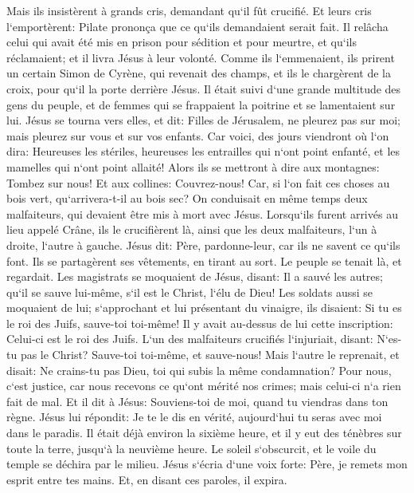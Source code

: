 \verse Mais ils insistèrent à grands cris, demandant qu`il fût crucifié. Et leurs cris l`emportèrent: 
\verse Pilate prononça que ce qu`ils demandaient serait fait. 
\verse Il relâcha celui qui avait été mis en prison pour sédition et pour meurtre, et qu`ils réclamaient; et il livra Jésus à leur volonté. 
\verse Comme ils l`emmenaient, ils prirent un certain Simon de Cyrène, qui revenait des champs, et ils le chargèrent de la croix, pour qu`il la porte derrière Jésus. 
\verse Il était suivi d`une grande multitude des gens du peuple, et de femmes qui se frappaient la poitrine et se lamentaient sur lui. 
\verse Jésus se tourna vers elles, et dit: Filles de Jérusalem, ne pleurez pas sur moi; mais pleurez sur vous et sur vos enfants. 
\verse Car voici, des jours viendront où l`on dira: Heureuses les stériles, heureuses les entrailles qui n`ont point enfanté, et les mamelles qui n`ont point allaité! 
\verse Alors ils se mettront à dire aux montagnes: Tombez sur nous! Et aux collines: Couvrez-nous! 
\verse Car, si l`on fait ces choses au bois vert, qu`arrivera-t-il au bois sec? 
\verse On conduisait en même temps deux malfaiteurs, qui devaient être mis à mort avec Jésus. 
\verse Lorsqu`ils furent arrivés au lieu appelé Crâne, ils le crucifièrent là, ainsi que les deux malfaiteurs, l`un à droite, l`autre à gauche. 
\verse Jésus dit: Père, pardonne-leur, car ils ne savent ce qu`ils font. Ils se partagèrent ses vêtements, en tirant au sort. 
\verse Le peuple se tenait là, et regardait. Les magistrats se moquaient de Jésus, disant: Il a sauvé les autres; qu`il se sauve lui-même, s`il est le Christ, l`élu de Dieu! 
\verse Les soldats aussi se moquaient de lui; s`approchant et lui présentant du vinaigre, 
\verse ils disaient: Si tu es le roi des Juifs, sauve-toi toi-même! 
\verse Il y avait au-dessus de lui cette inscription: Celui-ci est le roi des Juifs. 
\verse L`un des malfaiteurs crucifiés l`injuriait, disant: N`es-tu pas le Christ? Sauve-toi toi-même, et sauve-nous! 
\verse Mais l`autre le reprenait, et disait: Ne crains-tu pas Dieu, toi qui subis la même condamnation? 
\verse Pour nous, c`est justice, car nous recevons ce qu`ont mérité nos crimes; mais celui-ci n`a rien fait de mal. 
\verse Et il dit à Jésus: Souviens-toi de moi, quand tu viendras dans ton règne. 
\verse Jésus lui répondit: Je te le dis en vérité, aujourd`hui tu seras avec moi dans le paradis. 
\verse Il était déjà environ la sixième heure, et il y eut des ténèbres sur toute la terre, jusqu`à la neuvième heure. 
\verse Le soleil s`obscurcit, et le voile du temple se déchira par le milieu. 
\verse Jésus s`écria d`une voix forte: Père, je remets mon esprit entre tes mains. Et, en disant ces paroles, il expira. 
